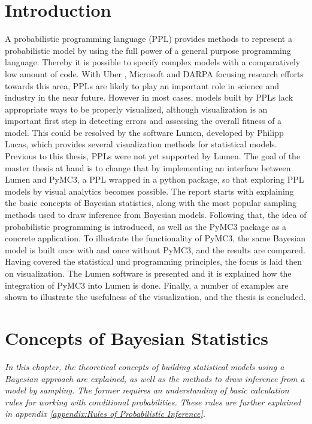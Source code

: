 \documentclass{article}
\begin{document}
\section{Introduction}
A probabilistic programming language (PPL) provides methods to represent a probabilistic model by using the full power of a general purpose programming language. Thereby it is possible to specify complex models with a comparatively low amount of code. With Uber \cite{bingham2018pyro}, Microsoft \cite{gordon2014probabilistic} and DARPA \cite{Hardesty2015} focusing research efforts towards this area, PPLs are likely to play an important role in science and industry in the near future.
However in most cases, models built by PPLs lack appropriate ways to be properly visualized, although visualization is an important first step in detecting errors and assessing the overall fitness of a model. This could be resolved by the software Lumen, developed by Philipp Lucas, which provides several visualization methods for statistical models. Previous to this thesis, PPLs were not yet supported by Lumen. The goal of the master thesis at hand is to change that by implementing an interface between Lumen and PyMC3, a PPL wrapped in a python package, so that exploring PPL models by visual analytics becomes possible. The report starts with explaining the basic concepts of Bayesian statistics, along with the most popular sampling methods used to draw inference from Bayesian models. Following that, the idea of probabilistic programming is introduced, as well as the PyMC3 package as a concrete application. To illustrate the functionality of PyMC3, the same Bayesian model is built once with and once without PyMC3, and the results are compared. Having covered the statistical und programming principles, the focus is laid then on visualization. The Lumen software is presented and it is explained how the integration of PyMC3 into Lumen is done. Finally, a number of examples are shown to illustrate the usefulness of the visualization, and the thesis is concluded.
\section{Concepts of Bayesian Statistics}
\textit{In this chapter, the theoretical concepts of building statistical models using a Bayesian approach are explained, as well as the methods to draw inference from a model by sampling. The former requires an understanding of basic calculation rules for working with conditional probabilities. These rules are further explained in appendix \ref{appendix:Rules of Probabilistic Inference}.}
\end{document}
